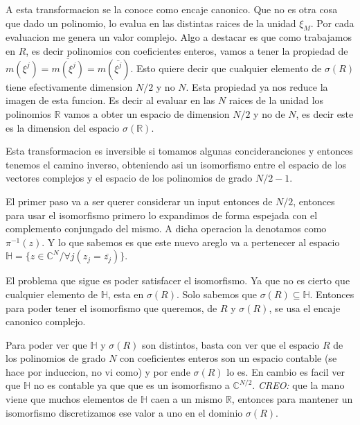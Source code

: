 \documentclass[12pt, oneside]{article}
\begin{document}

A esta transformacion se la conoce como encaje canonico.
Que no es otra cosa que dado un polinomio, lo evalua en las distintas raices de la unidad $\xi_M$.
Por cada evaluacion me genera un valor complejo.
Algo a destacar es que como trabajamos en  $R$, es decir polinomios con coeficientes enteros,
vamos a tener la propiedad de $m(\xi^j)=\overline{m(\xi^j)}=m(\overline{\xi^j})$.
Esto quiere decir que cualquier elemento de $\sigma(R)$ tiene efectivamente dimension
$N/2$ y no $N$.
Esta propiedad ya nos reduce la imagen de esta funcion.
Es decir al evaluar en las $N$ raices de la unidad los polinomios $\mathbb{R}$ vamos a
obter  un espacio de dimension $N/2$ y no de $N$, es decir este es la dimension del espacio
$\sigma(\mathbb{R})$.

Esta transformacion es inversible si tomamos algunas concideranciones y entonces tenemos el camino inverso, obteniendo asi un
isomorfismo entre el espacio de los vectores complejos y el espacio de los polinomios de grado
$N/2 -1$.


El primer paso va a ser  querer considerar un input entonces de $N/2$, entonces
para usar el isomorfismo primero lo expandimos de forma espejada con el
complemento conjungado del mismo.
A dicha operacion la denotamos como $\pi^{-1}(z)$.
Y lo que sabemos es que este nuevo areglo va a pertenecer al espacio
$\mathbb{H}=\{z\in\mathbb{C}^N/ \forall j (z_j=\overline{z_j})\}$.

El problema que sigue es poder satisfacer el isomorfismo.
Ya que no es cierto que cualquier elemento de $\mathbb{H}$,
esta en $\sigma(R)$.
Solo sabemos que $\sigma(R)\subseteq \mathbb{H}$.
Entonces para poder tener el isomorfismo que queremos, de $R$ y $\sigma(R)$,
se usa el encaje canonico complejo.

Para poder ver que $\mathbb{H}$ y $\sigma(R)$ son distintos, basta con ver que
el espacio $R$ de los polinomios de grado $N$ con coeficientes enteros son un espacio
contable (se hace por induccion, no vi como) y por ende $\sigma(R)$ lo es.
En cambio es facil ver que $\mathbb{H}$ no es contable ya que que es un isomorfismo
a $\mathbb{C}^{N/2}$.
\textit{CREO:} que la mano viene que muchos elementos de $\mathbb{H}$ caen a un mismo $\mathbb{R}$,
entonces para mantener un isomorfismo discretizamos ese valor a uno en el dominio $\sigma(R)$.
\end{document}
